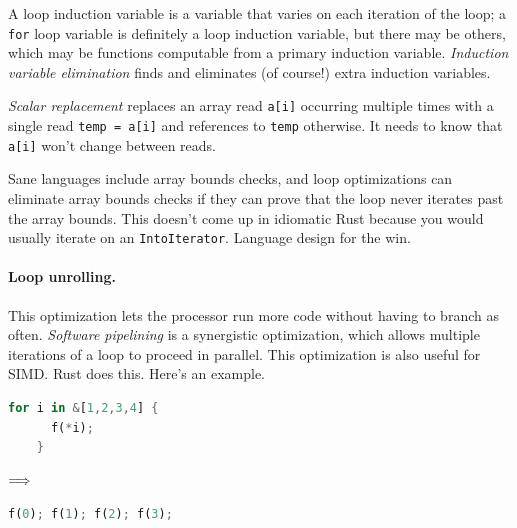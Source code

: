 A loop induction variable is a variable that varies on each iteration
of the loop; a \texttt{for} loop variable is definitely a loop induction variable,
but there may be others, which may be functions computable from a primary induction variable. \emph{Induction variable elimination} finds and eliminates (of course!) extra induction variables.

\emph{Scalar replacement} replaces an array read {\tt a[i]}
occurring multiple times with a single read {\tt temp = a[i]} and references
to {\tt temp} otherwise. It needs to know that {\tt a[i]} won't change
between reads.

Sane languages include array bounds checks, and loop optimizations
can eliminate array bounds checks if they can prove that the loop
never iterates past the array bounds. This doesn't come up in
idiomatic Rust because you would usually iterate on an
\texttt{IntoIterator}. Language design for the win.

\paragraph{Loop unrolling.} This optimization
lets the processor run more code without having to branch
as often. \emph{Software pipelining} is a synergistic optimization,
which allows multiple iterations of a loop to proceed in parallel.
This optimization is also useful for SIMD. Rust does this. Here's an example.
\begin{center}
\vspace*{-1em}
\begin{minipage}{.3\textwidth}
  \begin{lstlisting}[language=Rust]
    for i in &[1,2,3,4] {
      f(*i);
    }
  \end{lstlisting}
  \end{minipage} $\Longrightarrow \hspace*{2em}$ \begin{minipage}{.4\textwidth}
  \begin{lstlisting}[language=Rust]
f(0); f(1); f(2); f(3);
  \end{lstlisting}
  \end{minipage}
  \end{center}

